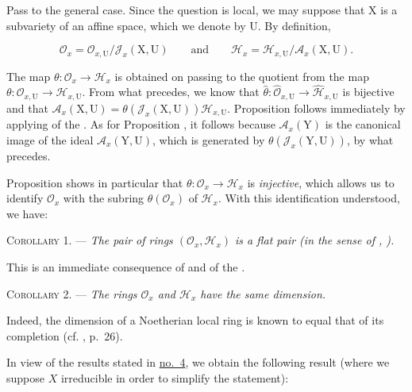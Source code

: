 Pass to the general case. Since the question is local, we may suppose that $\mathrm{X}$ is a subvariety of an affine space, which we denote by $\mathrm{U}$. By definition,

\begin{equation*}
\mathcal{O}_x=\mathcal{O}_{x,\mathrm{U}}/\mathcal{J}_x(\mathrm{X},\mathrm{U})
\qquad\text{and}\qquad
\mathcal{H}_x=\mathcal{H}_{x,\mathrm{U}}/\mathcal{A}_x(\mathrm{X},\mathrm{U}).
\end{equation*}

The map $\theta:\mathcal{O}_x\to\mathcal{H}_x$ is obtained on passing to the quotient from the map $\theta:\mathcal{O}_{x,\mathrm{U}}\to\mathcal{H}_{x,\mathrm{U}}$. From what precedes, we know that $\hat\theta:\hat{\mathcal{O}}_{x,\mathrm{U}}\to\hat{\mathcal{H}}_{x,\mathrm{U}}$ is bijective and that $\mathcal{A}_x(\mathrm{X},\mathrm{U})=\theta(\mathcal{J}_x(\mathrm{X},\mathrm{U}))\mathcal{H}_{x,\mathrm{U}}$. Proposition  follows immediately by applying  of the . As for Proposition , it follows because $\mathcal{A}_x(\mathrm{Y})$ is the canonical image of the ideal $\mathcal{A}_x(\mathrm{Y},\mathrm{U})$, which is generated by $\theta(\mathcal{J}_x(\mathrm{Y},\mathrm{U}))$, by what precedes.

Proposition  shows in particular that $\theta:\mathcal{O}_x\to\mathcal{H}_x$ is \emph{injective}, which allows us to identify $\mathcal{O}_x$ with the subring $\theta(\mathcal{O}_x)$ of $\mathcal{H}_x$. With this identification understood, we have:

\textsc{Corollary 1}. --- \emph{The pair of rings $(\mathcal{O}_x,\mathcal{H}_x)$ is a flat pair (in the sense of , ).}

This is an immediate consequence of  and  of the .

\textsc{Corollary 2}. --- \emph{The rings $\mathcal{O}_x$ and $\mathcal{H}_x$ have the same dimension.}

Indeed, the dimension of a Noetherian local ring is known to equal that of its completion (cf. , p.~26).

In view of the results stated in \hyperref[gaga:no:4]{no.~4}, we obtain the following result (where we suppose $X$ irreducible in order to simplify the statement):

